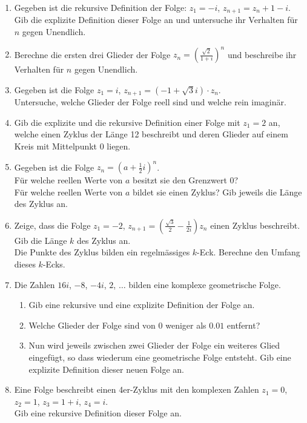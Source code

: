 \begin{ueb}
    {}{}
\begin{enumerate}
    \item Gegeben ist die rekursive Definition der Folge: $z_1 = -i$, $z_{n+1} = z_n + 1 - i$. \\
    Gib die explizite Definition dieser Folge an und untersuche ihr Verhalten für $n$ gegen Unendlich.

    \item Berechne die ersten drei Glieder der Folge $z_n = \left( \frac{\sqrt{2}}{1 + i} \right)^n$ und beschreibe ihr Verhalten für $n$ gegen Unendlich.

    \item Gegeben ist die Folge $z_1 = i$, $z_{n+1} = (-1 + \sqrt{3} i) \cdot z_n$. \\
    Untersuche, welche Glieder der Folge reell sind und welche rein imaginär.

    \item Gib die explizite und die rekursive Definition einer Folge mit $z_1 = 2$ an, welche einen Zyklus der Länge 12 beschreibt und deren Glieder auf einem Kreis mit Mittelpunkt 0 liegen.

    \item Gegeben ist die Folge $z_n = \left(a + \frac{1}{2} i \right)^n$. \\
    Für welche reellen Werte von $a$ besitzt sie den Grenzwert 0? \\
    Für welche reellen Werte von $a$ bildet sie einen Zyklus? Gib jeweils die Länge des Zyklus an.

    \item Zeige, dass die Folge $z_1 = -2$, $z_{n+1} = \left( \frac{\sqrt{3}}{2} - \frac{1}{2i} \right) z_n$ einen Zyklus beschreibt. Gib die Länge $k$ des Zyklus an. \\
    Die Punkte des Zyklus bilden ein regelmässiges $k$-Eck. Berechne den Umfang dieses $k$-Ecks.

    \item Die Zahlen $16i$, $-8$, $-4i$, $2$, $\ldots$ bilden eine komplexe geometrische Folge.
    \begin{enumerate}
        \item Gib eine rekursive und eine explizite Definition der Folge an.
        \item Welche Glieder der Folge sind von 0 weniger als $0.01$ entfernt?
        \item Nun wird jeweils zwischen zwei Glieder der Folge ein weiteres Glied eingefügt, so dass wiederum eine geometrische Folge entsteht. Gib eine explizite Definition dieser neuen Folge an.
    \end{enumerate}

    \item Eine Folge beschreibt einen 4er-Zyklus mit den komplexen Zahlen $z_1 = 0$, $z_2 = 1$, $z_3 = 1 + i$, $z_4 = i$. \\
    Gib eine rekursive Definition dieser Folge an.
\end{enumerate}

\end{ueb}

